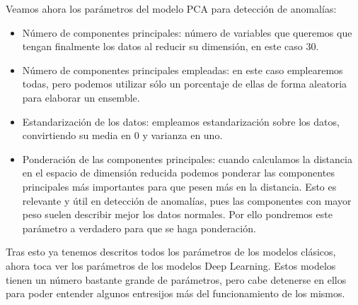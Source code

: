Veamos ahora los parámetros del modelo PCA para detección de anomalías:
\begin{itemize}
	\item Número de componentes principales: número de variables que queremos que tengan finalmente los datos al reducir su dimensión, en este caso 30.
	\item Número de componentes principales empleadas: en este caso emplearemos todas, pero podemos utilizar sólo un porcentaje de ellas de forma aleatoria para elaborar un ensemble.
	\item Estandarización de los datos: empleamos estandarización sobre los datos, convirtiendo su media en 0 y varianza en uno.
	\item Ponderación de las componentes principales: cuando calculamos la distancia en el espacio de dimensión reducida podemos ponderar las componentes principales más importantes para que pesen más en la distancia. Esto es relevante y útil en detección de anomalías, pues las componentes con mayor peso suelen describir mejor los datos normales. Por ello pondremos este parámetro a verdadero para que se haga ponderación.
\end{itemize}

Tras esto ya tenemos descritos todos los parámetros de los modelos clásicos, ahora toca ver los parámetros de los modelos Deep Learning. Estos modelos tienen un número bastante grande de parámetros, pero cabe detenerse en ellos para poder entender algunos entresijos más del funcionamiento de los mismos.

